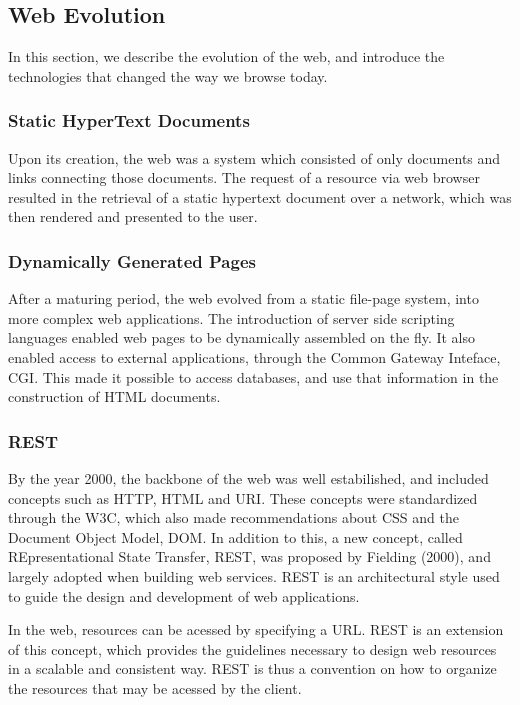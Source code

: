 \subsection{Web Evolution}

In this section, we describe the evolution of the web, and introduce the
technologies that changed the way we browse today.



\subsubsection{Static HyperText Documents}
Upon its creation, the web was a system which consisted of only documents and links
connecting those documents. The request of a resource via  web browser
resulted in the retrieval of a static hypertext document over a network, which was
then rendered and presented to the user.





\subsubsection{Dynamically Generated Pages}
After a maturing period, the web evolved from a static file-page system,
into more complex web applications. The introduction of server side scripting languages
enabled web pages to be dynamically assembled on the fly. It also enabled access to
external applications, through the Common Gateway Inteface, CGI.
This made it possible to access databases, and use that information in the construction
of HTML documents.




\subsubsection{REST}
By the year 2000, the backbone of the web was well estabilished, and included
concepts such as HTTP, HTML and URI. These concepts were standardized
through the W3C, which also made recommendations about CSS and the Document
Object Model, DOM.
In addition to this, a new concept, called REpresentational State Transfer, REST,
was proposed by Fielding (2000), and largely adopted when building web services.
REST is an  architectural style used to  guide the design and development of
web applications.

In the web, resources can be acessed
by specifying a URL. REST is an extension of this concept, which provides
the guidelines necessary to design web resources in a scalable and consistent way.
REST is thus a convention on how to organize the resources that may be acessed by the client.




